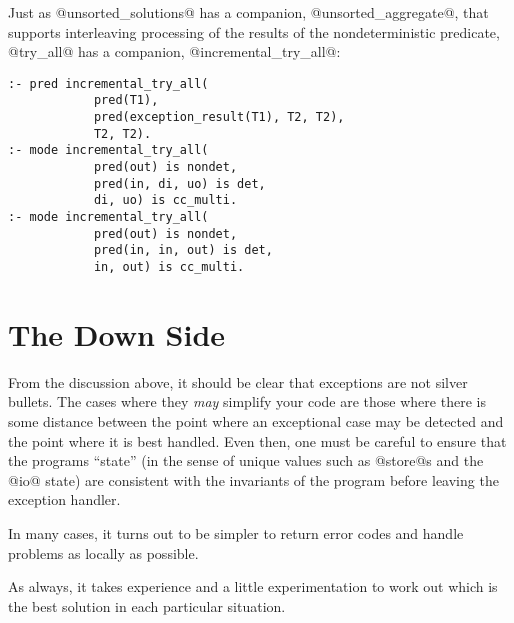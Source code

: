 Just as @unsorted_solutions@ has a companion, @unsorted_aggregate@,
that supports interleaving processing of the results of the
nondeterministic predicate, @try_all@ has a companion,
@incremental_try_all@:
\begin{verbatim}
:- pred incremental_try_all(
            pred(T1),
            pred(exception_result(T1), T2, T2),
            T2, T2).
:- mode incremental_try_all(
            pred(out) is nondet,
            pred(in, di, uo) is det,
            di, uo) is cc_multi.
:- mode incremental_try_all(
            pred(out) is nondet,
            pred(in, in, out) is det,
            in, out) is cc_multi.
\end{verbatim}


\section{The Down Side}

From the discussion above, it should be clear that exceptions are not
silver bullets.  The cases where they \emph{may} simplify your code are
those where there is some distance between the point where an exceptional
case may be detected and the point where it is best handled.  Even then,
one must be careful to ensure that the programs ``state'' (in the sense
of unique values such as @store@s and the @io@ state) are consistent with
the invariants of the program before leaving the exception handler.

In many cases, it turns out to be simpler to return error codes and
handle problems as locally as possible.

As always, it takes experience and a little experimentation to work out
which is the best solution in each particular situation.

